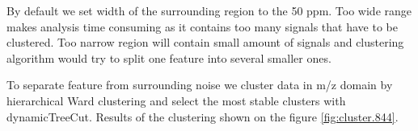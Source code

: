 \documentclass[]{article}
\newenvironment{Shaded}{\begin{snugshade}}{\end{snugshade}}
\newcommand{\KeywordTok}[1]{\textcolor[rgb]{0.13,0.29,0.53}{\textbf{#1}}}
\newcommand{\FloatTok}[1]{\textcolor[rgb]{0.00,0.00,0.81}{#1}}
\newcommand{\StringTok}[1]{\textcolor[rgb]{0.31,0.60,0.02}{#1}}
\newcommand{\OperatorTok}[1]{\textcolor[rgb]{0.81,0.36,0.00}{\textbf{#1}}}
\newcommand{\NormalTok}[1]{#1}
\begin{document}
\begin{Shaded}
\end{Shaded}

By default we set width of the surrounding region to the 50 ppm. Too wide range
makes analysis time consuming as it contains too many signals that have to be clustered. 
Too narrow region will contain small amount of signals and clustering algorithm would
try to split one feature into several smaller ones.

To separate feature from surrounding noise we cluster data in m/z domain
by hierarchical Ward clustering and select the most stable clusters with
dynamicTreeCut. Results of the clustering shown on the figure \ref{fig:cluster.844}.
\end{document}
